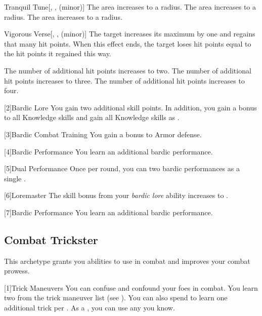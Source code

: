 {\begin{freeability}{Tranquil Tune}[, ,  (minor)]
                \rankline
                 The area increases to a \arealarge radius.
                 The area increases to a \areahuge radius.
                 The area increases to a \areaext radius.
            \end{freeability}

            \begin{freeability}{Vigorous Verse}[, ,  (minor)]
                The target increases its maximum  by one and regains that many hit points.
                When this effect ends, the target loses hit points equal to the hit points it regained this way.

                \rankline
                 The number of additional hit points increases to two.
                 The number of additional hit points increases to three.
                 The number of additional hit points increases to four.
            \end{freeability}
        }

        [2]{Bardic Lore} You gain two additional skill points.
        In addition, you gain a  bonus to all Knowledge skills and gain all Knowledge skills as .

        [3]{Bardic Combat Training} You gain a  bonus to Armor defense.

        [4]{Bardic Performance}
        You learn an additional bardic performance.

        [5]{Dual Performance}
        Once per round, you can  two bardic performances as a single .

        [6]{Loremaster} The skill bonus from your \textit{bardic lore} ability increases to .

        [7]{Bardic Performance}
        You learn an additional bardic performance.

    \subsection{Combat Trickster}
        This archetype grants you abilities to use in combat and improves your combat prowess.

        [1]{Trick Maneuvers}
        You can confuse and confound your foes in combat.
        You learn two  from the trick maneuver list (see ).
        You can also spend  to learn one additional trick  per .
        As a , you can use any  you know.

